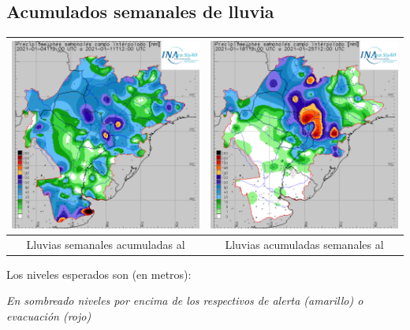 \documentclass[11pt,spanish] {article}
\DeclareRobustCommand{\fechaformat}{}
\DeclareRobustCommand{\fechapasada}{}
\DeclareRobustCommand{\pronodiario}{}
\begin{document}
\subsection{Acumulados semanales de lluvia}
\begin{tabular}{|c|c|}
	\hline
	\includegraphics[width=8.5cm]{synop_pasada.png} & \includegraphics[width=8.5cm]{synop_presente.png} \\
	\hline
	Lluvias semanales acumuladas al \fechapasada & Lluvias acumuladas semanales al \fechaformat \\
	\hline
\end{tabular}

Los niveles esperados son (en metros):

\begin{center}

\pronodiario

\emph{En sombreado niveles por encima de los respectivos de alerta (amarillo) o evacuación (rojo)}
\end{center}
\end{document}

